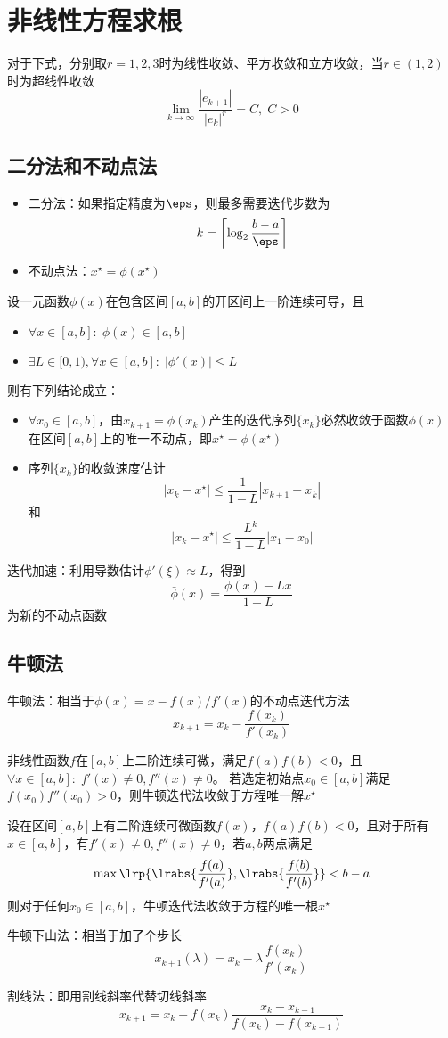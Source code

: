 
\section{非线性方程求根}
对于下式，分别取$r=1,2,3$时为线性收敛、平方收敛和立方收敛，当$r\in(1,2)$时为超线性收敛
\[\lim_{k\to\infty}\frac{|e_{k+1}|}{|e_k|^r}=C,\;C>0\]

\subsection{二分法和不动点法}
\begin{itemize}
\item 二分法：如果指定精度为$\eps$，则最多需要迭代步数为
\[k=\left\lceil\log_2\frac{b-a}{\eps}\right\rceil\]
\item 不动点法：$x^\star=\phi(x^\star)$
\end{itemize}
\begin{theorem}
    设一元函数$\phi(x)$在包含区间$[a,b]$的开区间上一阶连续可导，且
    \begin{itemize}
        \item $\forall x\in[a,b]:\;\phi(x)\in[a,b]$
        \item $\exists L\in[0,1),\forall x\in[a,b]:\;|\phi'(x)|\leq L$
    \end{itemize}
    则有下列结论成立：
    \begin{itemize}
        \item $\forall x_0\in[a,b]$，由$x_{k+1}=\phi(x_k)$产生的迭代序列$\{x_k\}$必然收敛于函数$\phi(x)$在区间$[a,b]$上的唯一不动点，即$x^\star=\phi(x^\star)$
        \item 序列$\{x_k\}$的收敛速度估计
        \[|x_k-x^\star|\leq\frac{1}{1-L}|x_{k+1}-x_k|\]
        和
        \[|x_k-x^\star|\leq\frac{L^k}{1-L}|x_1-x_0|\]
    \end{itemize}
\end{theorem}

迭代加速：利用导数估计$\phi'(\xi)\approx L$，得到
\[\bar{\phi}(x)=\frac{\phi(x)-Lx}{1-L}\]
为新的不动点函数

\subsection{牛顿法}
牛顿法：相当于$\phi(x)=x-f(x)/f'(x)$的不动点迭代方法
\[x_{k+1}=x_{k}-\frac{f(x_k)}{f'(x_k)}\]
\begin{theorem}[牛顿法全局收敛性]
非线性函数$f$在$[a,b]$上二阶连续可微，满足$f(a)f(b)<0$，且$\forall x\in[a,b]:\;f'(x)\ne 0,f''(x)\ne 0$。
若选定初始点$x_0\in[a,b]$满足$f(x_0)f''(x_0)>0$，则牛顿迭代法收敛于方程唯一解$x^\star$
\end{theorem}
\begin{theorem}
设在区间$[a,b]$上有二阶连续可微函数$f(x)$，$f(a)f(b)<0$，且对于所有$x\in[a,b]$，有$f'(x)\ne 0,f''(x)\ne 0$，若$a,b$两点满足
\[\max\lrp{\lrabs{\frac{f(a)}{f'(a)}},\lrabs{\frac{f(b)}{f'(b)}}}<b-a\]
则对于任何$x_0\in[a,b]$，牛顿迭代法收敛于方程的唯一根$x^\star$
\end{theorem}

牛顿下山法：相当于加了个步长
\[x_{k+1}(\lambda)=x_k-\lambda\frac{f(x_k)}{f'(x_k)}\]

割线法：即用割线斜率代替切线斜率
\[x_{k+1}=x_k-f(x_k)\frac{x_k-x_{k-1}}{f(x_k)-f(x_{k-1})}\]
